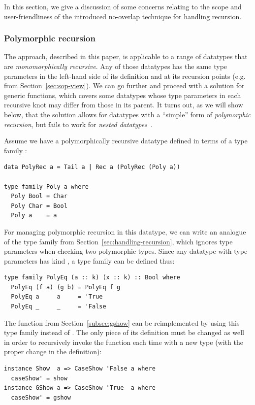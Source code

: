 \documentclass[sigplan,screen,review,anonymous]{acmart}
\begin{document}
In this section, we give a discussion of some concerns relating to the scope and user-friendliness of the introduced no-overlap technique for handling recursion.

\subsubsection{Polymorphic recursion}

The approach, described in this paper, is applicable to a range of datatypes that are \emph{monomorphically recursive}. Any of those datatypes has the same type parameters in the left-hand side of its definition and at its recursion points (e.g.  from Section~\ref{sec:sop-view}). We can go further and proceed with a solution for generic functions, which covers some datatypes whose type parameters in each recursive knot may differ from those in its parent. It turns out, as we will show below, that the solution allows for datatypes with a ``simple'' form of \emph{polymorphic recursion}, but fails to work for \emph{nested datatypes}~\cite{Bird1998}.

Assume we have a polymorphically recursive datatype  defined in terms of a type family :
\begin{lstlisting}[style=fancy]
data PolyRec a = Tail a | Rec a (PolyRec (Poly a))

type family Poly a where
  Poly Bool = Char
  Poly Char = Bool
  Poly a    = a
\end{lstlisting}

For managing polymorphic recursion in this datatype, we can write an analogue of the  type family from Section~\ref{sec:handling-recursion}, which ignores type parameters when checking two polymorphic types. Since any datatype with type parameters  has kind , a  type family can be defined thus:
\begin{lstlisting}[style=fancy]
type family PolyEq (a :: k) (x :: k) :: Bool where
  PolyEq (f a) (g b) = PolyEq f g
  PolyEq a     a     = 'True
  PolyEq _     _     = 'False
\end{lstlisting}

The function  from Section~\ref{subsec:gshow} can be reimplemented by using this type family instead of . The only piece of its definition must be changed as well in order to recursively invoke the function each time with a new type (with the proper change in the  definition):
\begin{lstlisting}[style=fancy]
instance Show  a => CaseShow 'False a where
  caseShow' = show
instance GShow a => CaseShow 'True  a where
  caseShow' = gshow
\end{lstlisting}
\end{document}
